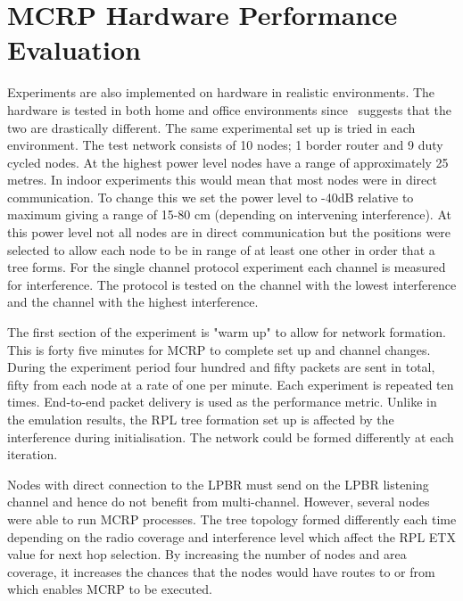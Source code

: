 \section{MCRP Hardware Performance Evaluation}
\label{MCRPhardware}

Experiments are also implemented on hardware in realistic environments.  The hardware is tested in both home and office environments since~\cite{homearea} suggests that the two are drastically different.  The same experimental set up is tried in each environment.  The test network consists of 10 nodes; 1 border router and 9 duty cycled nodes.  At the highest power level nodes have a range of approximately 25 metres.  In indoor experiments this would mean that most nodes were in direct communication.  To change this we set the power level to -40dB relative to maximum giving a range of 15-80 cm (depending on intervening interference).  At this power level not all nodes are in direct communication but the positions were selected to allow each node to be in range of at least one other in order that a tree forms.  For the single channel protocol experiment each channel is measured for interference.  The protocol is tested on the channel with the lowest interference and the channel with the highest interference.

The first section of the experiment is "warm up" to allow for network formation.  This is forty five minutes for MCRP to complete set up and channel changes. During the experiment period four hundred and fifty packets are sent in total, fifty from each node at a rate of one per minute.  Each experiment is repeated ten times.  End-to-end packet delivery is used as the performance metric.  Unlike in the emulation results, the RPL tree formation set up is affected by the interference during initialisation. The network could be formed differently at each iteration.  

Nodes with direct connection to the LPBR must send on the LPBR listening channel and hence do not benefit from multi-channel.  However, several nodes were able to run MCRP processes. The tree topology formed differently each time depending on the radio coverage and interference level which affect the RPL ETX value for next hop selection. By increasing the number of nodes and area coverage, it increases the chances that the nodes would have routes to or from which enables MCRP to be executed.  

